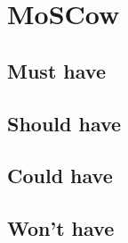 \section{MoSCow}

\subsection{Must have}

\subsection{Should have}

\subsection{Could have}

\subsection{Won't have}